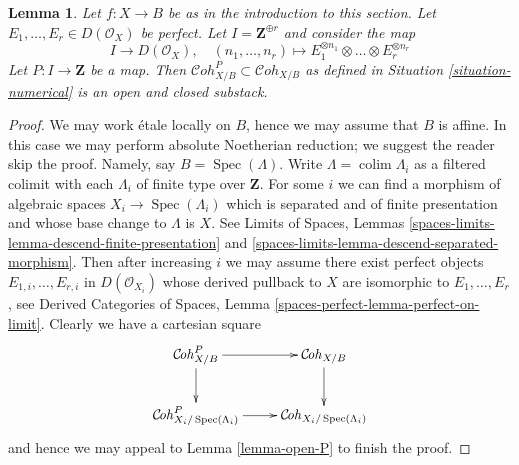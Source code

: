 \documentclass{stacks-project}
\theoremstyle{plain}
\newtheorem{lemma}[subsection]{Lemma}
\theoremstyle{definition}
\theoremstyle{remark}
\numberwithin{equation}{subsection}
\def\colim{\mathop{\mathrm{colim}}\nolimits}
\def\Spec{\mathop{\mathrm{Spec}}}
\def\Cohstack{\mathcal{C}\!\mathit{oh}}
\begin{document}
\begin{lemma}
\label{lemma-finite-list-perfect-objects}
Let $f : X \to B$ be as in the introduction to this section.
Let $E_1, \ldots, E_r \in D(\mathcal{O}_X)$ be perfect.
Let $I = \mathbf{Z}^{\oplus r}$ and consider the map
$$
I \longrightarrow D(\mathcal{O}_X),\quad
(n_1, \ldots, n_r) \longmapsto
E_1^{\otimes n_1}
\otimes \ldots \otimes
E_r^{\otimes n_r}
$$
Let $P : I \to \mathbf{Z}$ be a map. Then
$\Cohstack^P_{X/B} \subset \Cohstack_{X/B}$
as defined in Situation \ref{situation-numerical}
is an open and closed substack.
\end{lemma}

\begin{proof}
We may work \'etale locally on $B$, hence we may assume that $B$ is affine.
In this case we may perform absolute Noetherian reduction; we suggest
the reader skip the proof. Namely, say $B = \Spec(\Lambda)$.
Write $\Lambda = \colim \Lambda_i$ as a filtered colimit with each $\Lambda_i$
of finite type over $\mathbf{Z}$. For some $i$ we can find
a morphism of algebraic spaces $X_i \to \Spec(\Lambda_i)$
which is separated and of finite presentation and whose base change
to $\Lambda$ is $X$. See Limits of Spaces, Lemmas
\ref{spaces-limits-lemma-descend-finite-presentation} and
\ref{spaces-limits-lemma-descend-separated-morphism}.
Then after increasing $i$ we may assume there exist
perfect objects $E_{1, i}, \ldots, E_{r, i}$
in $D(\mathcal{O}_{X_i})$ whose derived pullback to $X$
are isomorphic to $E_1, \ldots, E_r$, see
Derived Categories of Spaces, Lemma
\ref{spaces-perfect-lemma-perfect-on-limit}.
Clearly we have a cartesian square
$$
\xymatrix{
\Cohstack^P_{X/B} \ar[r] \ar[d] &
\Cohstack_{X/B} \ar[d] \\
\Cohstack^P_{X_i/\Spec(\Lambda_i)} \ar[r] &
\Cohstack_{X_i/\Spec(\Lambda_i)}
}
$$
and hence we may appeal to Lemma \ref{lemma-open-P}
to finish the proof.
\end{proof}
\end{document}
